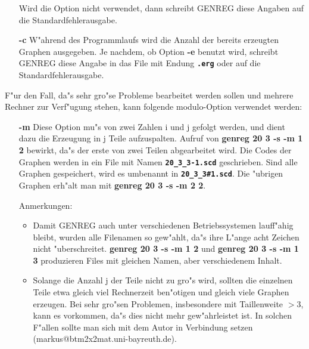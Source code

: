 \begin{itemize}
  Wird die Option nicht verwendet, dann schreibt GENREG
  diese Angaben auf die Standardfehlerausgabe.

 \item[\bf -c]
  W"ahrend des Programmlaufs wird die Anzahl der bereits erzeugten
  Graphen ausgegeben. Je nachdem, ob Option {\bf -e}
  benutzt wird, schreibt GENREG diese Angabe in das File
  mit Endung {\bf \verb|.erg|} oder auf die Standardfehlerausgabe.

\end{itemize}

F"ur den Fall, da"s sehr gro"se Probleme bearbeitet werden sollen
und mehrere Rechner zur Verf"ugung stehen, kann folgende
\glqq modulo\grqq -Option verwendet werden:

\begin{itemize}

 \item[\bf -m]
 Diese Option mu"s von zwei Zahlen i und j gefolgt werden,
 und dient dazu die Erzeugung in j Teile aufzuspalten.
 Aufruf von {\bf genreg 20 3 -s -m 1 2} bewirkt, da"s
 der erste von zwei Teilen abgearbeitet wird. Die Codes
 der Graphen werden in ein File mit Namen {\bf \verb|20_3_3-1.scd|}
 geschrieben. Sind alle Graphen gespeichert, wird es umbenannt in
 {\bf \verb|20_3_3#1.scd|}. Die "ubrigen Graphen erh"alt
 man mit {\bf genreg 20 3 -s -m 2 2}.

 Anmerkungen:

 \begin{itemize}
  \item
   Damit GENREG auch unter verschiedenen Betriebssystemen
   lauff"ahig bleibt,
   wurden alle Filenamen so gew"ahlt, da"s ihre L"ange
   acht Zeichen nicht "uberschreitet. {\bf genreg 20 3 -s -m 1 2}
   und {\bf genreg 20 3 -s -m 1 3} produzieren Files mit
   gleichen Namen, aber verschiedenem Inhalt.
  \item
   Solange die Anzahl j der Teile nicht zu gro"s wird,
   sollten die einzelnen Teile etwa gleich viel Rechnerzeit
   ben"otigen und gleich viele Graphen erzeugen. Bei
   sehr gro"sen Problemen, insbesondere mit Taillenweite $>3$,
   kann es vorkommen, da"s dies nicht mehr gew"ahrleistet ist.
   In solchen F"allen sollte man sich mit dem Autor in Verbindung
   setzen (markus@btm2x2mat.uni-bayreuth.de).
 \end{itemize}

\end{itemize}


